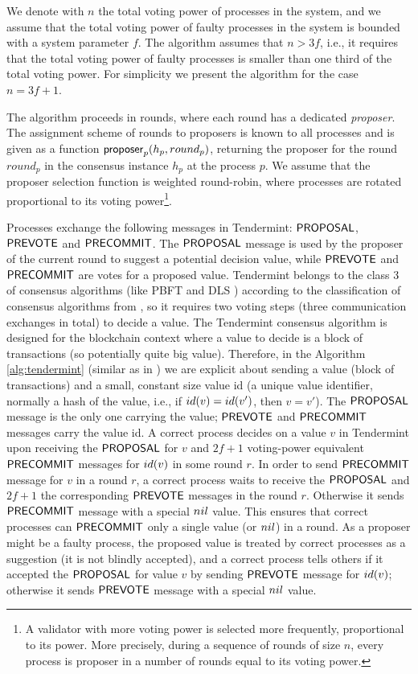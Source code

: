 We denote with $n$ the total voting power of processes in the system, and we assume that the total voting power of faulty processes in the system is bounded with a system parameter $f$. 
The algorithm assumes that $n > 3f$, i.e., it requires that the total voting power of faulty processes is smaller than one third of the total voting power. For simplicity we present the algorithm for the case $n = 3f + 1$.

The algorithm proceeds in rounds, where each round has a dedicated \emph{proposer}. The assignment scheme of rounds to proposers is known to all processes and is given as a function $\mathsf{proposer}_p(h_p, round_p)$, returning the proposer for the round $round_p$ in the consensus instance $h_p$ at the process $p$. We assume that the proposer selection function is weighted round-robin, where processes are rotated proportional to its voting power\footnote{A validator with more voting power is selected more frequently, proportional to its power. More precisely, during a sequence of rounds of size $n$, every process is proposer in a number of rounds equal to its voting power.}. 

Processes exchange the following messages in Tendermint: $\mathsf{PROPOSAL}$, $\mathsf{PREVOTE}$ and $\mathsf{PRECOMMIT}$. The 
$\mathsf{PROPOSAL}$ message is used by the proposer of the current round to suggest a potential decision value, while 
$\mathsf{PREVOTE}$ and $\mathsf{PRECOMMIT}$ are votes for a proposed value. Tendermint belongs to the class 3 of consensus algorithms (like PBFT \cite{CL02:tcs} and DLS \cite{DLS88:jacm}) according to the classification of consensus algorithms from \cite{RMS10:dsn}, so it requires two voting steps (three communication exchanges in total) to decide a value. The Tendermint consensus algorithm is designed for the blockchain context where a value to decide is a block of transactions (so potentially quite big value). Therefore, in the Algorithm \ref{alg:tendermint} (similar as in \cite{CL02:tcs}) we are explicit about sending a value (block of transactions) and a small, constant size value id (a unique value identifier, normally a hash of the value, i.e., if $id(v) = id(v')$, then $v=v'$). The $\mathsf{PROPOSAL}$ message is the only one carrying the value; $\mathsf{PREVOTE}$ and $\mathsf{PRECOMMIT}$ messages carry the value id. 
A correct process decides on a value $v$ in Tendermint upon receiving the $\mathsf{PROPOSAL}$ for $v$ and $2f+1$ voting-power equivalent $\mathsf{PRECOMMIT}$ messages for $id(v)$ in some round $r$. In order to send $\mathsf{PRECOMMIT}$ message for $v$ in a round $r$, a correct process waits to receive the $\mathsf{PROPOSAL}$ and $2f+1$ the corresponding $\mathsf{PREVOTE}$ messages in the round $r$. Otherwise it sends $\mathsf{PRECOMMIT}$ message with a special $nil$ value.  This ensures that correct processes can $\mathsf{PRECOMMIT}$ only a single value (or $nil$) in a round. 
As a proposer might be a faulty process, the proposed value is treated by correct processes as a suggestion (it is not blindly accepted), and a correct process tells others if it accepted the $\mathsf{PROPOSAL}$ for value $v$ by sending $\mathsf{PREVOTE}$ message for $id(v)$; otherwise it sends $\mathsf{PREVOTE}$ message with a special $nil$ value. 

